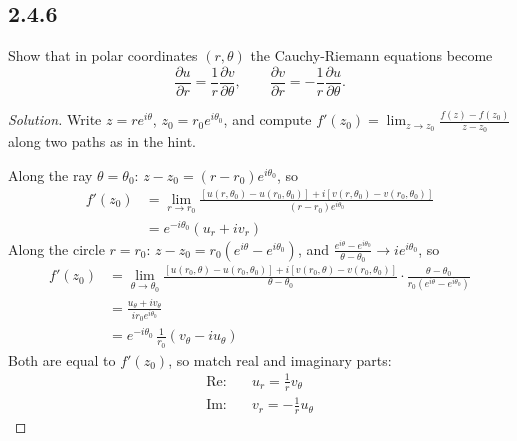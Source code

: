 \documentclass{article}
\newenvironment{solution}{
\begin{proof}[Solution]}{
\end{proof}}
\begin{document}
\subsection*{2.4.6}
Show that in polar coordinates $(r, \theta)$ the Cauchy-Riemann equations become
\[
  \frac{\partial u}{\partial r} = \frac{1}{r}\frac{\partial v}{\partial \theta},
  \qquad
  \frac{\partial v}{\partial r} = -\frac{1}{r}\frac{\partial u}{\partial \theta}.
\]
\begin{solution}
  Write $z = re^{i\theta}$, $z_0 = r_0e^{i\theta_0}$, and compute
  $f'(z_0) = \lim_{z \to z_0} \frac{f(z) - f(z_0)}{z - z_0}$ along two paths as in the hint.

  Along the ray $\theta = \theta_0$: $z - z_0 = (r - r_0)e^{i\theta_0}$, so
  \begin{align*}
    f'(z_0)
    &= \lim_{r \to r_0} \frac{\left[u(r,\theta_0) - u(r_0,\theta_0)\right] + i\left[v(r,\theta_0) - v(r_0,\theta_0)\right]}{(r - r_0)e^{i\theta_0}}
    \\ &= e^{-i\theta_0}\left(u_r + iv_r\right)
  \end{align*}
  Along the circle $r = r_0$: $z - z_0 = r_0\left(e^{i\theta} - e^{i\theta_0}\right)$, and
  $\frac{e^{i\theta} - e^{i\theta_0}}{\theta - \theta_0} \to ie^{i\theta_0}$, so
  \begin{align*}
    f'(z_0)
    &= \lim_{\theta \to \theta_0} \frac{\left[u(r_0,\theta) - u(r_0,\theta_0)\right] + i\left[v(r_0,\theta) - v(r_0,\theta_0)\right]}{\theta - \theta_0}
       \cdot \frac{\theta - \theta_0}{r_0\left(e^{i\theta} - e^{i\theta_0}\right)}
    \\ &= \frac{u_\theta + iv_\theta}{ir_0e^{i\theta_0}}
    \\ &= e^{-i\theta_0}\,\frac{1}{r_0}\left(v_\theta - iu_\theta\right)
  \end{align*}
  Both are equal to $f'(z_0)$, so match real and imaginary parts:
  \begin{align*}
    \text{Re:} \quad & u_r = \frac{1}{r}v_\theta
    \\ \text{Im:} \quad & v_r = -\frac{1}{r}u_\theta
  \end{align*}
\end{solution}
\end{document}
